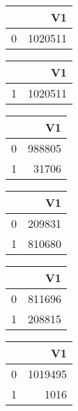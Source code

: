 \bigskip\bigskip
\centering
\begin{tabular}{rr}
  \hline
 & V1 \\ 
  \hline
0 & 1020511 \\ 
   \hline
\end{tabular}

\bigskip\bigskip
\centering
\begin{tabular}{rr}
  \hline
 & V1 \\ 
  \hline
1 & 1020511 \\ 
   \hline
\end{tabular}

\bigskip\bigskip
\centering
\begin{tabular}{rr}
  \hline
 & V1 \\ 
  \hline
0 & 988805 \\ 
  1 & 31706 \\ 
   \hline
\end{tabular}

\bigskip\bigskip
\centering
\begin{tabular}{rr}
  \hline
 & V1 \\ 
  \hline
0 & 209831 \\ 
  1 & 810680 \\ 
   \hline
\end{tabular}

\bigskip\bigskip
\centering
\begin{tabular}{rr}
  \hline
 & V1 \\ 
  \hline
0 & 811696 \\ 
  1 & 208815 \\ 
   \hline
\end{tabular}

\bigskip\bigskip
\centering
\begin{tabular}{rr}
  \hline
 & V1 \\ 
  \hline
0 & 1019495 \\ 
  1 & 1016 \\ 
   \hline
\end{tabular}

